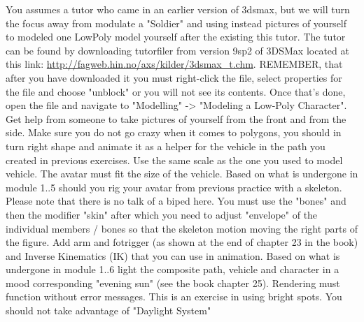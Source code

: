You assumes a tutor who came in an earlier version of 3dsmax, but we will turn the focus away from modulate a "Soldier" and using instead pictures of yourself 
to modeled one LowPoly model yourself after the existing this tutor. 
The tutor can be found by downloading tutorfiler from version 9sp2 of 3DSMax located at this link: \url{http://fagweb.hin.no/axs/kilder/3dsmax_t.chm}. 
REMEMBER, that after you have downloaded it you must right-click the file, select properties for the file and choose "unblock" or you will not see its contents. 
Once that's done, open the file and navigate to "Modelling" -> "Modeling a Low-Poly Character". 
Get help from someone to take pictures of yourself from the front and from the side. 
Make sure you do not go crazy when it comes to polygons, you should in turn right shape and animate it as a helper for the vehicle in the path you created in previous exercises. 
Use the same scale as the one you used to model vehicle. 
The avatar must fit the size of the vehicle.
\vspace{0.5em}\newline
Based on what is undergone in module 1..5 should you rig your avatar from previous practice with a skeleton. 
Please note that there is no talk of a biped here. 
You must use the "bones" and then the modifier "skin" after which you need to adjust "envelope" of the individual members / bones 
so that the skeleton motion moving the right parts of the figure. 
Add arm and fotrigger (as shown at the end of chapter 23 in the book) and Inverse Kinematics (IK) that you can use in animation.
\vspace{0.5em}\newline
Based on what is undergone in module 1..6 light the composite path, vehicle and character in a mood corresponding "evening sun" (see the book chapter 25). 
Rendering must function without error messages. This is an exercise in using bright spots. 
You should not take advantage of "Daylight System"
